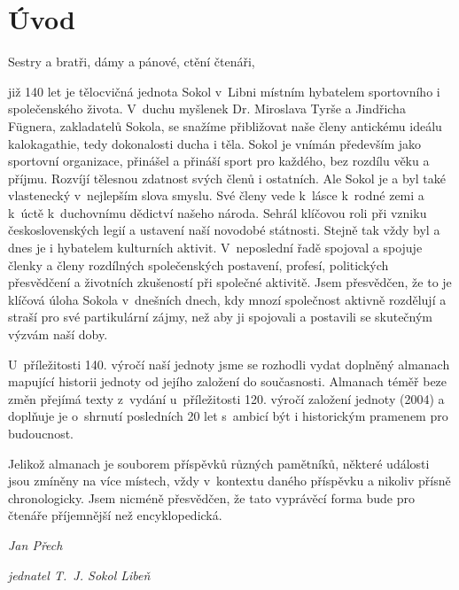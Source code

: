 \documentclass[a5paper, 11pt, twoside]{article}
\begin{document}
\tableofcontents

\cleardoublepage


\setlength{\parskip}{0pt}

\section{Úvod}

Sestry a bratři, dámy a pánové, ctění čtenáři,

\noindent již 140 let je tělocvičná jednota Sokol v~Libni místním hybatelem
sportovního i společenského života. V~duchu myšlenek Dr. Miroslava Tyrše
a Jindřicha Fügnera, zakladatelů Sokola, se snažíme přibližovat naše
členy antickému ideálu kalokagathie, tedy dokonalosti ducha i těla.
Sokol je vnímán především jako sportovní organizace, přinášel a přináší
sport pro každého, bez rozdílu věku a příjmu. Rozvíjí tělesnou zdatnost
svých členů i ostatních. Ale Sokol je a byl také vlastenecký v~nejlepším
slova smyslu. Své členy vede k~lásce k~rodné zemi a k~úctě k~duchovnímu
dědictví našeho národa. Sehrál klíčovou roli při vzniku československých
legií a ustavení naší novodobé státnosti. Stejně tak vždy byl a dnes je
i hybatelem kulturních aktivit. V~neposlední řadě spojoval a spojuje
členky a členy rozdílných společenských postavení, profesí, politických
přesvědčení a životních zkušeností při společné aktivitě. Jsem
přesvědčen, že to je klíčová úloha Sokola v~dnešních dnech, kdy mnozí
společnost aktivně rozdělují a straší pro své partikulární zájmy, než
aby ji spojovali a postavili se skutečným výzvám naší doby.

\par U~příležitosti 140. výročí naší jednoty jsme se rozhodli vydat doplněný
almanach mapující historii jednoty od jejího založení do současnosti.
Almanach téměř beze změn přejímá texty z~vydání u~příležitosti 120.
výročí založení jednoty (2004) a doplňuje je o~shrnutí posledních 20 let
s~ambicí být i historickým pramenem pro budoucnost.

Jelikož almanach je souborem příspěvků různých pamětníků, některé
události jsou zmíněny na více místech, vždy v~kontextu daného příspěvku
a nikoliv přísně chronologicky. Jsem nicméně přesvědčen, že tato
vyprávěcí forma bude pro čtenáře příjemnější než encyklopedická.

\vspace{\baselineskip}
\hfill\textit{Jan Přech}

\hfill\textit{jednatel T.~J. Sokol Libeň}
\end{document}

